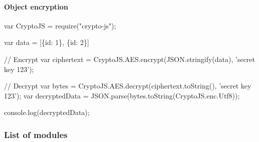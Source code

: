 \paragraph*{Object encryption}


\begin{DoxyCode}
var CryptoJS = require("crypto-js");

var data = [\{id: 1\}, \{id: 2\}]

// Encrypt
var ciphertext = CryptoJS.AES.encrypt(JSON.stringify(data), 'secret key 123');

// Decrypt
var bytes  = CryptoJS.AES.decrypt(ciphertext.toString(), 'secret key 123');
var decryptedData = JSON.parse(bytes.toString(CryptoJS.enc.Utf8));

console.log(decryptedData);
\end{DoxyCode}


\subsubsection*{List of modules}


